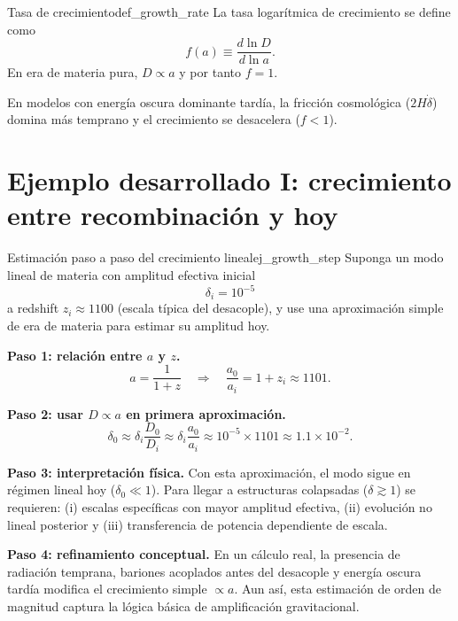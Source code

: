 \begin{definicion}{Tasa de crecimiento}{def_growth_rate}
La tasa logarítmica de crecimiento se define como
\begin{equation}
f(a)\equiv\frac{d\ln D}{d\ln a}.
\end{equation}
En era de materia pura, $D\propto a$ y por tanto $f=1$.
\end{definicion}

En modelos con energía oscura dominante tardía, la fricción cosmológica ($2H\dot\delta$) domina más temprano y el crecimiento se desacelera ($f<1$).

\section{Ejemplo desarrollado I: crecimiento entre recombinación y hoy}
\label{sec:ejemplo_crecimiento_recomb}

\begin{ejemplo}{Estimación paso a paso del crecimiento lineal}{ej_growth_step}
Suponga un modo lineal de materia con amplitud efectiva inicial
\begin{equation}
\delta_i=10^{-5}
\end{equation}
a redshift $z_i\approx 1100$ (escala típica del desacople), y use una aproximación simple de era de materia para estimar su amplitud hoy.

\textbf{Paso 1: relación entre $a$ y $z$.}
\begin{equation}
a=\frac{1}{1+z}
\quad\Rightarrow\quad
\frac{a_0}{a_i}=1+z_i\approx 1101.
\end{equation}

\textbf{Paso 2: usar $D\propto a$ en primera aproximación.}
\begin{equation}
\delta_0\approx\delta_i\frac{D_0}{D_i}\approx\delta_i\frac{a_0}{a_i}
\approx10^{-5}\times1101\approx1.1\times10^{-2}.
\end{equation}

\textbf{Paso 3: interpretación física.}
Con esta aproximación, el modo sigue en régimen lineal hoy ($\delta_0\ll1$). Para llegar a estructuras colapsadas ($\delta\gtrsim1$) se requieren: (i) escalas específicas con mayor amplitud efectiva, (ii) evolución no lineal posterior y (iii) transferencia de potencia dependiente de escala.

\textbf{Paso 4: refinamiento conceptual.}
En un cálculo real, la presencia de radiación temprana, bariones acoplados antes del desacople y energía oscura tardía modifica el crecimiento simple $\propto a$. Aun así, esta estimación de orden de magnitud captura la lógica básica de amplificación gravitacional.
\end{ejemplo}

